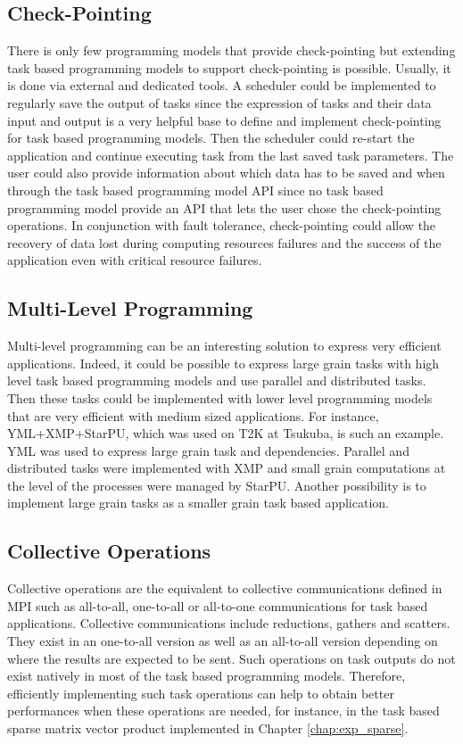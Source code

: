 \subsection{Check-Pointing}
There is only few programming models that provide check-pointing but extending task based programming models to support check-pointing is possible.
Usually, it is done via external and dedicated tools.
A scheduler could be implemented to regularly save the output of tasks since the expression of tasks and their data input and output is a very helpful base to define and implement check-pointing for task based programming models.
Then the scheduler could re-start the application and continue executing task from the last saved task parameters.
The user could also provide information about which data has to be saved and when through the task based programming model API since no task based programming model provide an API that lets the user chose the check-pointing operations.
In conjunction with fault tolerance, check-pointing could allow the recovery of data lost during computing resources failures and the success of the application even with critical resource failures.

\subsection{Multi-Level Programming}
Multi-level programming can be an interesting solution to express very efficient applications.
Indeed, it could be possible to express large grain tasks with high level task based programming models and use parallel and distributed tasks.
Then these tasks could be implemented with lower level programming models that are very efficient with medium sized applications.
For instance, YML+XMP+StarPU, which was used on T2K at Tsukuba, is such an example.
YML was used to express large grain task and dependencies.
Parallel and distributed tasks were implemented with XMP and small grain computations at the level of the processes were managed by StarPU.
Another possibility is to implement large grain tasks as a smaller grain task based application.

\subsection{Collective Operations}
Collective operations are the equivalent to collective communications defined in MPI such as all-to-all, one-to-all or all-to-one communications for task based applications.
Collective communications include reductions, gathers and scatters.
They exist in an one-to-all version as well as an all-to-all version depending on where the results are expected to be sent.
Such operations on task outputs do not exist natively in most of the task based programming models.
Therefore, efficiently implementing such task operations can help to obtain better performances when these operations are needed, for instance, in the task based sparse matrix vector product implemented in Chapter \ref{chap:exp_sparse}.

